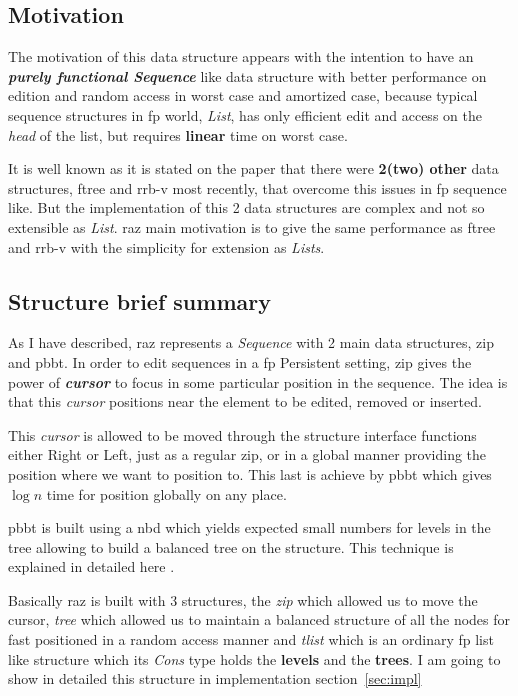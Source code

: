 \documentclass[12pt, a4paper]{article}
\begin{document}
\subsection{Motivation}
The motivation of this data structure appears with the intention to have an \textbf{\textit{purely functional Sequence}} like data structure with better performance on edition and random access in worst case and amortized case, because typical sequence structures in \acrfull{fp} world, \textit{List}, has only efficient edit and access on the \textit{head} of the list, but requires \textbf{linear} time on worst case.

It is well known as it is stated on the paper that there were \textbf{2(two) other} data structures, \acrfull{ftree} and \acrfull{rrb-v} most recently, that overcome this issues in \acrshort{fp} sequence like. But the implementation of this 2 data structures are complex and not so extensible as \textit{List}. \acrshort{raz} main motivation is to give the same performance as \acrshort{ftree} and \acrshort{rrb-v} with the simplicity for extension as \textit{Lists}.

\subsection{Structure brief summary}\label{sub:sec:1}
As I have described, \acrshort{raz} represents a \textit{Sequence} with 2 main data structures, \acrshort{zip} and \acrshort{pbbt}. In order to edit sequences in a \acrshort{fp} Persistent setting, \acrshort{zip} gives the power of \textbf{\textit{cursor}} to focus in some particular position in the sequence. The idea is that this \textit{cursor} positions near the element to be edited, removed or inserted.

This \textit{cursor} is allowed to be moved through the structure interface functions either Right or Left, just as a regular \acrshort{zip}, or in a global manner providing the position where we want to position to. This last is achieve by \acrshort{pbbt} which gives $\log{n}$ time for position globally on any place.

\acrshort{pbbt} is built using a \acrfull{nbd} which yields expected small numbers for levels in the tree allowing to build a balanced tree on the structure. This technique is explained in detailed here \cite{pbbt}.

Basically \acrshort{raz} is built with 3 structures, the \textit{zip} which allowed us to move the cursor, \textit{tree} which allowed us to maintain a balanced structure of all the nodes for fast positioned in a random access manner and \textit{tlist} which is an ordinary \acrshort{fp} list like structure which its \textit{Cons} type holds the \textbf{levels} and the \textbf{trees}. I am going to show in detailed this structure in implementation section~\ref{sec:impl}
\end{document}
